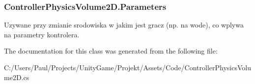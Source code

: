 \subsubsection[{Parameters}]{ Controller\+Physics\+Volume2\+D.\+Parameters}\label{class_controller_physics_volume2_d_a57a01a60fe2b7a3ab0bd7808211a42b7}


Uzywane przy zmianie srodowiska w jakim jest gracz (np. na wode), co wplywa na parametry kontrolera. 



The documentation for this class was generated from the following file\+:\begin{DoxyCompactItemize}
\item 
C\+:/\+Users/\+Paul/\+Projects/\+Unity\+Game/\+Projekt/\+Assets/\+Code/Controller\+Physics\+Volume2\+D.\+cs\end{DoxyCompactItemize}
